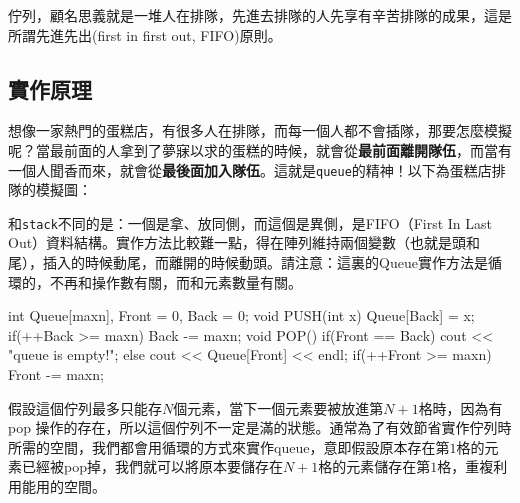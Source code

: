 \documentclass[main.tex]{subfiles}
\begin{document}
佇列，顧名思義就是一堆人在排隊，先進去排隊的人先享有辛苦排隊的成果，這是所謂先進先出(first in first out, FIFO)原則。

\subsection{實作原理}
想像一家熱門的蛋糕店，有很多人在排隊，而每一個人都不會插隊，那要怎麼模擬呢？當最前面的人拿到了夢寐以求的蛋糕的時候，就會從\textbf{最前面離開隊伍}，而當有一個人聞香而來，就會從\textbf{最後面加入隊伍}。這就是\texttt{queue}的精神！以下為蛋糕店排隊的模擬圖：
\begin{center}
\end{center}
和\texttt{stack}不同的是：一個是拿、放同側，而這個是異側，是FIFO（First In Last Out）資料結構。實作方法比較難一點，得在陣列維持兩個變數（也就是頭和尾），插入的時候動尾，而離開的時候動頭。請注意：這裏的Queue實作方法是循環的，不再和操作數有關，而和元素數量有關。
\begin{C++}
int Queue[maxn], Front = 0, Back = 0;
void PUSH(int x) {
	Queue[Back] = x;
    if(++Back >= maxn) Back -= maxn;
}
void POP(){
    if(Front == Back)
        cout << "queue is empty!\n";
    else{
    	cout << Queue[Front] << endl;
        if(++Front >= maxn) Front -= maxn;
    }
}
\end{C++}
\indent\indent 假設這個佇列最多只能存$N$個元素，當下一個元素要被放進第$N+1$格時，因為有 pop 操作的存在，所以這個佇列不一定是滿的狀態。通常為了有效節省實作佇列時所需的空間，我們都會用循環的方式來實作queue，意即假設原本存在第$1$格的元素已經被pop掉，我們就可以將原本要儲存在$N+1$格的元素儲存在第$1$格，重複利用能用的空間。
\end{document}
